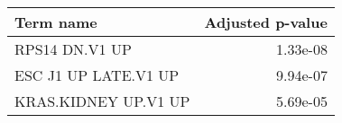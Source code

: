 \begin{tabular}{lr}
\toprule
           Term name &  Adjusted p-value \\
\midrule
      RPS14 DN.V1 UP &          1.33e-08 \\
ESC J1 UP LATE.V1 UP &          9.94e-07 \\
KRAS.KIDNEY UP.V1 UP &          5.69e-05 \\
\bottomrule
\end{tabular}
